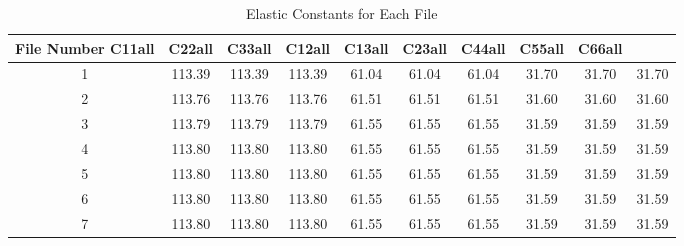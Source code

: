\begin{table}[H]
\centering
\begin{tabular}{|c|c|c|c|c|c|c|c|c|c|}
\hline
File Number C11all & C22all & C33all & C12all & C13all & C23all & C44all & C55all & C66all \\
\hline
1 & 113.39 & 113.39 & 113.39 & 61.04 & 61.04 & 61.04 & 31.70 & 31.70 & 31.70 \\
\hline
2 & 113.76 & 113.76 & 113.76 & 61.51 & 61.51 & 61.51 & 31.60 & 31.60 & 31.60 \\
\hline
3 & 113.79 & 113.79 & 113.79 & 61.55 & 61.55 & 61.55 & 31.59 & 31.59 & 31.59 \\
\hline
4 & 113.80 & 113.80 & 113.80 & 61.55 & 61.55 & 61.55 & 31.59 & 31.59 & 31.59 \\
\hline
5 & 113.80 & 113.80 & 113.80 & 61.55 & 61.55 & 61.55 & 31.59 & 31.59 & 31.59 \\
\hline
6 & 113.80 & 113.80 & 113.80 & 61.55 & 61.55 & 61.55 & 31.59 & 31.59 & 31.59 \\
\hline
7 & 113.80 & 113.80 & 113.80 & 61.55 & 61.55 & 61.55 & 31.59 & 31.59 & 31.59 \\
\hline
\end{tabular}
\caption{Elastic Constants for Each File}
\label{tab:elastic_constants}
\end{table}
